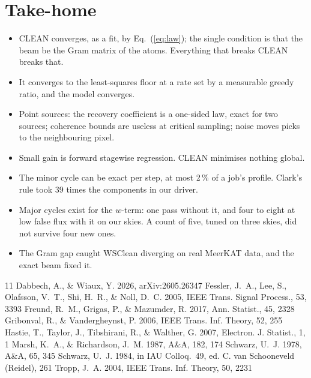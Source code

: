 \documentclass[twocolumn,10pt]{article}
\theoremstyle{remark}
\begin{document}
\section{Take-home}

\begin{itemize}\itemsep1pt
\item CLEAN converges, as a fit, by Eq.~(\ref{eq:law}); the single condition is that the beam be the Gram matrix of the atoms. Everything that breaks CLEAN breaks that.
\item It converges to the least-squares floor at a rate set by a measurable greedy ratio, and the model converges.
\item Point sources: the recovery coefficient is a one-sided law, exact for two sources; coherence bounds are useless at critical sampling; noise moves picks to the neighbouring pixel.
\item Small gain is forward stagewise regression. CLEAN minimises nothing global.
\item The minor cycle can be exact per step, at most 2\,\% of a job's profile. Clark's rule took 39 times the components in our driver.
\item Major cycles exist for the $w$-term: one pass without it, and four to eight at low false flux with it on our skies. A count of five, tuned on three skies, did not survive four new ones.
\item The Gram gap caught WSClean diverging on real MeerKAT data, and the exact beam fixed it.
\end{itemize}

\begin{thebibliography}{11}
 Dabbech, A., \& Wiaux, Y. 2026, arXiv:2605.26347
 Fessler, J.~A., Lee, S., Olafsson, V.~T., Shi, H.~R., \& Noll, D.~C. 2005, IEEE Trans. Signal Process., 53, 3393
 Freund, R.~M., Grigas, P., \& Mazumder, R. 2017, Ann. Statist., 45, 2328
 Gribonval, R., \& Vandergheynst, P. 2006, IEEE Trans. Inf. Theory, 52, 255
 Hastie, T., Taylor, J., Tibshirani, R., \& Walther, G. 2007, Electron. J. Statist., 1, 1
 Marsh, K.~A., \& Richardson, J.~M. 1987, A\&A, 182, 174
 Schwarz, U.~J. 1978, A\&A, 65, 345
 Schwarz, U.~J. 1984, in IAU Colloq.~49, ed. C. van Schooneveld (Reidel), 261
 Tropp, J.~A. 2004, IEEE Trans. Inf. Theory, 50, 2231
\end{thebibliography}
\end{document}
